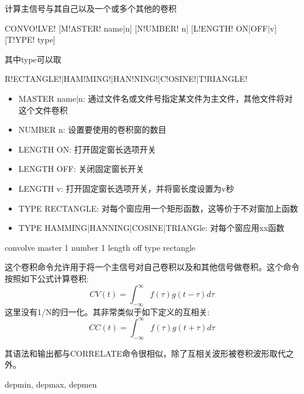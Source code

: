 \label{cmd:convolve}

计算主信号与其自己以及一个或多个其他的卷积

\begin{SACSTX}
CONVO!LVE! [M!ASTER! name|n] [N!UMBER! n] [L!ENGTH! ON|OFF|v] [T!YPE! type]
\end{SACSTX}
其中type可以取
\begin{SACSTX}
R!ECTANGLE!|HAM!MING!|HAN!NING!|C!OSINE!|T!RIANGLE!
\end{SACSTX}

\begin{itemize}
\item MASTER name|n: 通过文件名或文件号指定某文件为主文件，其他文件将对这个文件卷积
\item NUMBER n: 设置要使用的卷积窗的数目
\item LENGTH ON: 打开固定窗长选项开关
\item LENGTH OFF: 关闭固定窗长开关
\item LENGTH v: 打开固定窗长选项开关，并将窗长度设置为v秒
\item TYPE RECTANGLE: 对每个窗应用一个矩形函数，这等价于不对窗加上函数
\item TYPE HAMMING|HANNING|COSINE|TRIANGle: 对每个窗应用xx函数
\end{itemize}

\begin{SACDFT}
convolve master 1 number 1 length off type rectangle
\end{SACDFT}

这个卷积命令允许用于将一个主信号对自己卷积以及和其他信号做卷积。这个命令按照如下公式计算卷积:
	\[ CV(t) = \int_{-\infty} ^\infty f(\tau)g(t-\tau)d\tau \]
这里没有1/N的归一化。其非常类似于如下定义的互相关:
	\[ CC(t) = \int_{-\infty} ^\infty f(\tau)g(t+\tau)d\tau \]
	
其语法和输出都与CORRELATE命令很相似，除了互相关波形被卷积波形取代之外。

depmin, depmax, depmen
